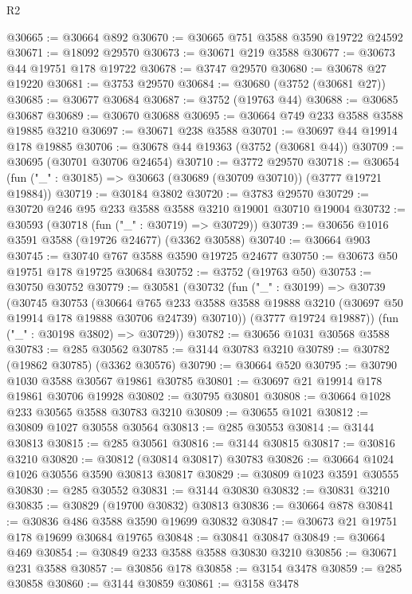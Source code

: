 \begin{lexlean}{R2}
\begin{coremodule}
@30665 := @30664 @892
@30670 := @30665 @751 @3588 @3590 @19722 @24592
@30671 := @18092 @29570
@30673 := @30671 @219 @3588
@30677 := @30673 @44 @19751 @178 @19722
@30678 := @3747 @29570
@30680 := @30678 @27 @19220
@30681 := @3753 @29570
@30684 := @30680 (@3752 (@30681 @27))
@30685 := @30677 @30684
@30687 := @3752 (@19763 @44)
@30688 := @30685 @30687
@30689 := @30670 @30688
@30695 := @30664 @749 @233 @3588 @3588 @19885 @3210
@30697 := @30671 @238 @3588
@30701 := @30697 @44 @19914 @178 @19885
@30706 := @30678 @44 @19363 (@3752 (@30681 @44))
@30709 := @30695 (@30701 @30706 @24654)
@30710 := @3772 @29570
@30718 := @30654 (fun ("_" : @30185) => @30663 (@30689 (@30709 @30710)) (@3777 @19721 @19884))
@30719 := @30184 @3802
@30720 := @3783 @29570
@30729 := @30720 @246 @95 @233 @3588 @3588 @3210 @19001 @30710 @19004
@30732 := @30593 (@30718 (fun ("_" : @30719) => @30729))
@30739 := @30656 @1016 @3591 @3588 (@19726 @24677) (@3362 @30588)
@30740 := @30664 @903
@30745 := @30740 @767 @3588 @3590 @19725 @24677
@30750 := @30673 @50 @19751 @178 @19725 @30684
@30752 := @3752 (@19763 @50)
@30753 := @30750 @30752
@30779 := @30581
    (@30732
      (fun ("_" : @30199) =>
      @30739
        (@30745
          @30753
          (@30664
            @765
            @233
            @3588
            @3588
            @19888
            @3210
            (@30697 @50 @19914 @178 @19888 @30706 @24739)
            @30710))
        (@3777 @19724 @19887))
      (fun ("_" : @30198 @3802) => @30729))
@30782 := @30656 @1031 @30568 @3588
@30783 := @285 @30562
@30785 := @3144 @30783 @3210
@30789 := @30782 (@19862 @30785) (@3362 @30576)
@30790 := @30664 @520
@30795 := @30790 @1030 @3588 @30567 @19861 @30785
@30801 := @30697 @21 @19914 @178 @19861 @30706 @19928
@30802 := @30795 @30801
@30808 := @30664 @1028 @233 @30565 @3588 @30783 @3210
@30809 := @30655 @1021
@30812 := @30809 @1027 @30558 @30564
@30813 := @285 @30553
@30814 := @3144 @30813
@30815 := @285 @30561
@30816 := @3144 @30815
@30817 := @30816 @3210
@30820 := @30812 (@30814 @30817) @30783
@30826 := @30664 @1024 @1026 @30556 @3590 @30813 @30817
@30829 := @30809 @1023 @3591 @30555
@30830 := @285 @30552
@30831 := @3144 @30830
@30832 := @30831 @3210
@30835 := @30829 (@19700 @30832) @30813
@30836 := @30664 @878
@30841 := @30836 @486 @3588 @3590 @19699 @30832
@30847 := @30673 @21 @19751 @178 @19699 @30684 @19765
@30848 := @30841 @30847
@30849 := @30664 @469
@30854 := @30849 @233 @3588 @3588 @30830 @3210
@30856 := @30671 @231 @3588
@30857 := @30856 @178
@30858 := @3154 @3478
@30859 := @285 @30858
@30860 := @3144 @30859
@30861 := @3158 @3478

\end{coremodule}
\end{lexlean}
